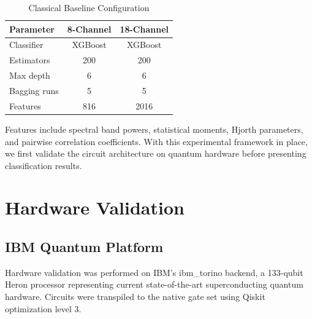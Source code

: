 \documentclass[pdflatex,sn-mathphys-num]{sn-jnl}
\begin{document}
\begin{table}[htbp]
\centering
\caption{Classical Baseline Configuration}
\label{tab:classical}
\begin{tabular}{lcc}
\toprule
Parameter & 8-Channel & 18-Channel \\
\midrule
Classifier & XGBoost & XGBoost \\
Estimators & 200 & 200 \\
Max depth & 6 & 6 \\
Bagging runs & 5 & 5 \\
Features & 816 & 2016 \\
\bottomrule
\end{tabular}
\end{table}

Features include spectral band powers, statistical moments, Hjorth parameters, and pairwise correlation coefficients. With this experimental framework in place, we first validate the circuit architecture on quantum hardware before presenting classification results.

\section{Hardware Validation}
\label{sec:hardware}

\subsection{IBM Quantum Platform}
\label{sec:ibm}

Hardware validation was performed on IBM's ibm\_torino backend, a 133-qubit Heron processor representing current state-of-the-art superconducting quantum hardware. Circuits were transpiled to the native gate set using Qiskit \cite{javadi2024} optimization level 3.
\end{document}
